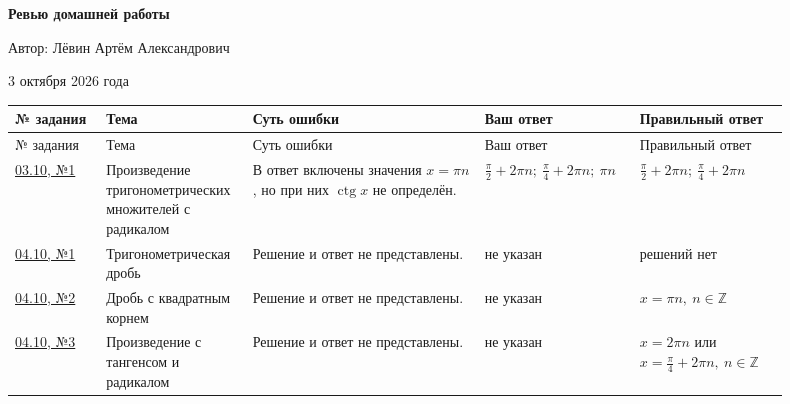 \documentclass[12pt,a4paper]{article}
\begin{document}
\thispagestyle{empty}
\vspace*{\fill}
\begin{center}
{\LARGE\bfseries Ревью домашней работы\par}
\vspace{1.2cm}
{\large Автор: Лёвин Артём Александрович\par}
\vspace{0.7cm}
{\large 3 октября 2026 года\par}
\end{center}
\vspace*{\fill}
\begin{center}
\end{center}
\newpage

{\small
\setlength{\tabcolsep}{3pt}
\begin{longtable}{>{\raggedright\arraybackslash}p{0.11\linewidth}
                  >{\raggedright\arraybackslash}p{0.15\linewidth}
                  >{\raggedright\arraybackslash}p{0.28\linewidth}
                  >{\raggedright\arraybackslash}p{0.18\linewidth}
                  >{\raggedright\arraybackslash}p{0.18\linewidth}}
\toprule
№ задания & Тема & Суть ошибки & Ваш ответ & Правильный ответ \\
\midrule
\endfirsthead
\toprule
№ задания & Тема & Суть ошибки & Ваш ответ & Правильный ответ \\
\midrule
\endhead
\hyperref[task:0310-1]{03.10, №1} &
Произведение тригонометрических множителей с радикалом &
В ответ включены значения \(x=\pi n\), но при них \(\operatorname{ctg}x\) не определён. &
\(\frac{\pi}{2}+2\pi n;\ \frac{\pi}{4}+2\pi n;\ \pi n\) &
\(\frac{\pi}{2}+2\pi n;\ \frac{\pi}{4}+2\pi n\) \\
\midrule
\hyperref[task:0410-1]{04.10, №1} &
Тригоно\-метрическая дробь &
Решение и ответ не представлены. &
не указан &
решений нет \\
\midrule
\hyperref[task:0410-2]{04.10, №2} &
Дробь с квадратным корнем &
Решение и ответ не представлены. &
не указан &
\(x=\pi n,\ n\in\mathbb Z\) \\
\midrule
\hyperref[task:0410-3]{04.10, №3} &
Произведение с тангенсом и радикалом &
Решение и ответ не представлены. &
не указан &
\(x=2\pi n\) или \(x=\frac{\pi}{4}+2\pi n,\ n\in\mathbb Z\) \\
\bottomrule
\end{longtable}
}
\end{document}
